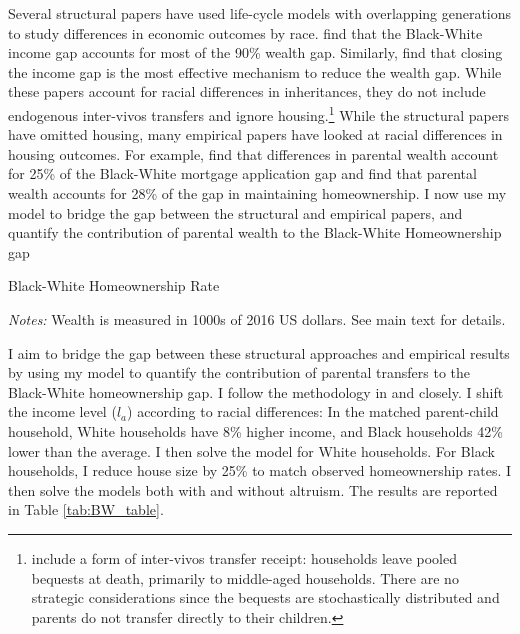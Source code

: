 \documentclass[12pt]{article}
\begin{document}
Several structural papers have used life-cycle models with overlapping generations to study differences in economic outcomes by race. \cite{Ashman2020} find that the Black-White income gap accounts for most of the 90\% wealth gap. Similarly, \cite{aliprantis2022dynamics} find that closing the income gap is the most effective mechanism to reduce the wealth gap. While these papers account for racial differences in inheritances, they do not include endogenous inter-vivos transfers and ignore housing.\footnote{\cite{aliprantis2022dynamics} include a form of inter-vivos transfer receipt: households leave pooled bequests at death, primarily to middle-aged households. There are no strategic considerations since the bequests are stochastically distributed and parents do not transfer directly to their children.} While the structural papers have omitted housing, many empirical papers have looked at racial differences in housing outcomes. For example, \cite{charles2002transition} find that differences in parental wealth account for 25\% of the Black-White mortgage application gap and \cite{bond2021role} find that parental wealth accounts for 28\% of the gap in maintaining homeownership. I now use my model to bridge the gap between the structural and empirical papers, and quantify the contribution of parental wealth to the Black-White Homeownership gap
\begin{table}
	\center
\begin{threeparttable}[tb]
				\singlespacing
		\caption{Black-White Homeownership Rate}\label{tab:BW_table}
		
		\footnotesize
		\textit{Notes:} Wealth is measured in 1000s of 2016 US dollars. See main text for details.
	\end{threeparttable}
\end{table}


I aim to bridge the gap between these structural approaches and empirical results by using my model to quantify the contribution of parental transfers to the Black-White homeownership gap. I follow the methodology in \cite{Ashman2020} and \cite{aliprantis2022dynamics} closely. I shift the income level ($l_a$) according to racial differences: In the matched parent-child household, White households have 8\% higher income, and Black households 42\% lower than the average. I then solve the model for White households. For Black households, I reduce house size by 25\% to match observed homeownership rates. I then solve the models both with and without altruism. The results are reported in Table \ref{tab:BW_table}. 
\end{document}
